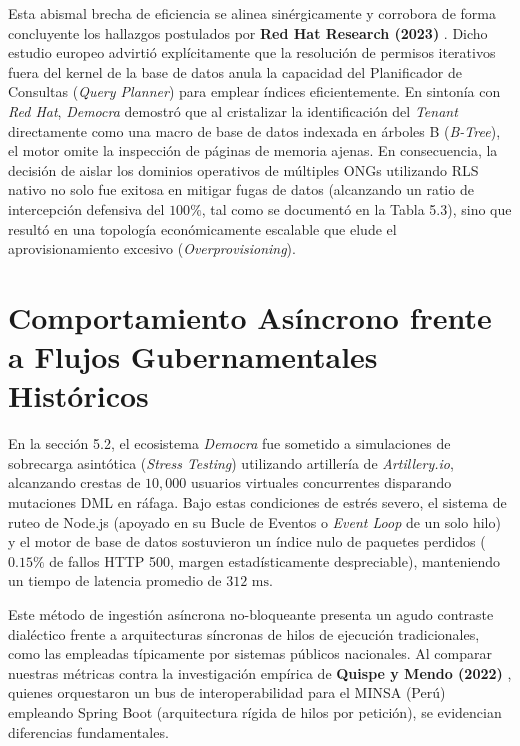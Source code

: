 \documentclass[11pt,a4paper,oneside]{report}
\begin{document}
Esta abismal brecha de eficiencia se alinea sin\'ergicamente y corrobora de forma concluyente los hallazgos postulados por \textbf{Red Hat Research (2023)} \citep{redhat2023}. Dicho estudio europeo advirti\'o expl\'icitamente que la resoluci\'on de permisos iterativos fuera del kernel de la base de datos anula la capacidad del Planificador de Consultas (\textit{Query Planner}) para emplear \'indices eficientemente. En sinton\'ia con \textit{Red Hat}, \textit{Democra} demostr\'o que al cristalizar la identificaci\'on del \textit{Tenant} directamente como una macro de base de datos indexada en \'arboles B (\textit{B-Tree}), el motor omite la inspecci\'on de p\'aginas de memoria ajenas. En consecuencia, la decisi\'on de aislar los dominios operativos de m\'ultiples ONGs utilizando RLS nativo no solo fue exitosa en mitigar fugas de datos (alcanzando un ratio de intercepci\'on defensiva del $100\%$, tal como se document\'o en la Tabla 5.3), sino que result\'o en una topolog\'ia econ\'omicamente escalable que elude el aprovisionamiento excesivo (\textit{Overprovisioning}).

\section{Comportamiento As\'incrono frente a Flujos Gubernamentales Hist\'oricos}

En la secci\'on 5.2, el ecosistema \textit{Democra} fue sometido a simulaciones de sobrecarga asint\'otica (\textit{Stress Testing}) utilizando artiller\'ia de \textit{Artillery.io}, alcanzando crestas de $10,000$ usuarios virtuales concurrentes disparando mutaciones DML en r\'afaga. Bajo estas condiciones de estr\'es severo, el sistema de ruteo de Node.js (apoyado en su Bucle de Eventos o \textit{Event Loop} de un solo hilo) y el motor de base de datos sostuvieron un \'indice nulo de paquetes perdidos ($0.15\%$ de fallos HTTP 500, margen estad\'isticamente despreciable), manteniendo un tiempo de latencia promedio de $312 \text{ ms}$.

Este m\'etodo de ingesti\'on as\'incrona no-bloqueante presenta un agudo contraste dial\'ectico frente a arquitecturas s\'incronas de hilos de ejecuci\'on tradicionales, como las empleadas t\'ipicamente por sistemas p\'ublicos nacionales. Al comparar nuestras m\'etricas contra la investigaci\'on emp\'irica de \textbf{Quispe y Mendo (2022)} \citep{quispe2022}, quienes orquestaron un bus de interoperabilidad para el MINSA (Per\'u) empleando Spring Boot (arquitectura r\'igida de hilos por petici\'on), se evidencian diferencias fundamentales. 
\end{document}
